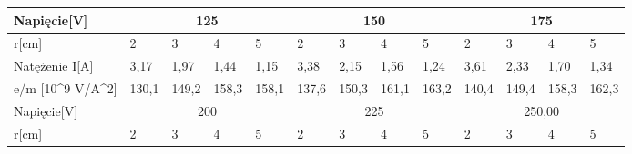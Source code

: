 \documentclass{article}
\begin{document}
\begin{table}[H]
\begin{tabular}{|l|llll|llll|llll|}
\hline
Napięcie{[}V{]}                                         & \multicolumn{4}{c|}{125}                                                                                          & \multicolumn{4}{c|}{150}                                                                                          & \multicolumn{4}{c|}{175}                                                                                          \\ \hline
r{[}cm{]}                                               & \multicolumn{1}{l|}{2}     & \multicolumn{1}{l|}{3}     & \multicolumn{1}{l|}{4}     & 5                          & \multicolumn{1}{l|}{2}     & \multicolumn{1}{l|}{3}     & \multicolumn{1}{l|}{4}     & 5                          & \multicolumn{1}{l|}{2}     & \multicolumn{1}{l|}{3}     & \multicolumn{1}{l|}{4}     & 5                          \\ \hline
Natężenie I{[}A{]}                                      & \multicolumn{1}{l|}{3,17}  & \multicolumn{1}{l|}{1,97}  & \multicolumn{1}{l|}{1,44}  & 1,15                       & \multicolumn{1}{l|}{3,38}  & \multicolumn{1}{l|}{2,15}  & \multicolumn{1}{l|}{1,56}  & 1,24                       & \multicolumn{1}{l|}{3,61}  & \multicolumn{1}{l|}{2,33}  & \multicolumn{1}{l|}{1,70}  & 1,34                       \\ \hline
e/m {[}10\textasciicircum{}9 V/A\textasciicircum{}2{]}  & \multicolumn{1}{c|}{130,1} & \multicolumn{1}{c|}{149,2} & \multicolumn{1}{c|}{158,3} & \multicolumn{1}{c|}{158,1} & \multicolumn{1}{c|}{137,6} & \multicolumn{1}{c|}{150,3} & \multicolumn{1}{c|}{161,1} & \multicolumn{1}{c|}{163,2} & \multicolumn{1}{c|}{140,4} & \multicolumn{1}{c|}{149,4} & \multicolumn{1}{c|}{158,3} & \multicolumn{1}{c|}{162,3} \\ \hline
Napięcie{[}V{]}                                         & \multicolumn{4}{c|}{200}                                                                                          & \multicolumn{4}{c|}{225}                                                                                          & \multicolumn{4}{c|}{250,00}                                                                                       \\ \hline
r{[}cm{]}                                               & \multicolumn{1}{l|}{2}     & \multicolumn{1}{l|}{3}     & \multicolumn{1}{l|}{4}     & 5                          & \multicolumn{1}{l|}{2}     & \multicolumn{1}{l|}{3}     & \multicolumn{1}{l|}{4}     & 5                          & \multicolumn{1}{l|}{2}     & \multicolumn{1}{l|}{3}     & \multicolumn{1}{l|}{4}     & 5                          \\ \hline

\end{tabular}
\end{table}
\end{document}
